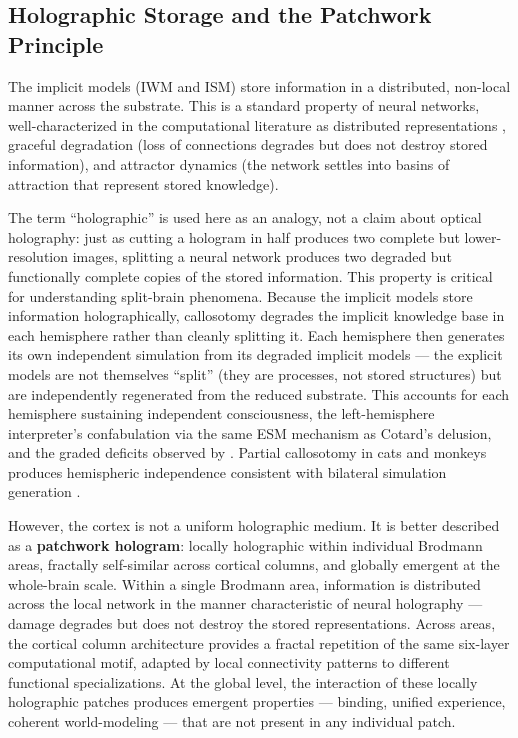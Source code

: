\documentclass[12pt]{article}
\newcommand{\revstart}{}
\newcommand{\revend}{}
\begin{document}
\subsection{Holographic Storage and the Patchwork Principle}


The implicit models (IWM and ISM) store information in a distributed, non-local manner across the substrate. This is a standard property of neural networks, well-characterized in the computational literature as distributed representations \citep{Hinton1986}, graceful degradation (loss of connections degrades but does not destroy stored information), and attractor dynamics (the network settles into basins of attraction that represent stored knowledge).

The term ``holographic'' is used here as an analogy, not a claim about optical holography: just as cutting a hologram in half produces two complete but lower-resolution images, splitting a neural network produces two degraded but functionally complete copies of the stored information. This property is critical for understanding split-brain phenomena. {\revstart Because the implicit models store information holographically, callosotomy degrades the implicit knowledge base in each hemisphere rather than cleanly splitting it. Each hemisphere then generates its own independent simulation from its degraded implicit models --- the explicit models are not themselves ``split'' (they are processes, not stored structures) but are independently regenerated from the reduced substrate. This accounts for each hemisphere sustaining independent consciousness, the left-hemisphere interpreter's confabulation \citep{Gazzaniga2000} via the same ESM mechanism as Cotard's delusion, and the graded deficits observed by \citet{Pinto2017}. Partial callosotomy in cats and monkeys produces hemispheric independence consistent with bilateral simulation generation \citep{MyersSperry1958,Trevarthen1962}.\revend}

However, the cortex is not a uniform holographic medium. It is better described as a \textbf{patchwork hologram}: locally holographic within individual Brodmann areas, fractally self-similar across cortical columns, and globally emergent at the whole-brain scale. Within a single Brodmann area, information is distributed across the local network in the manner characteristic of neural holography --- damage degrades but does not destroy the stored representations. Across areas, the cortical column architecture provides a fractal repetition of the same six-layer computational motif, adapted by local connectivity patterns to different functional specializations. At the global level, the interaction of these locally holographic patches produces emergent properties --- binding, unified experience, coherent world-modeling --- that are not present in any individual patch.
\end{document}
